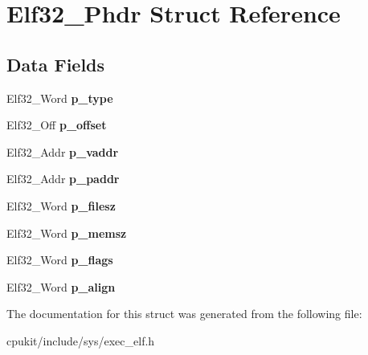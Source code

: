 \hypertarget{structElf32__Phdr}{}\section{Elf32\+\_\+\+Phdr Struct Reference}
\label{structElf32__Phdr}
\subsection*{Data Fields}
\begin{DoxyCompactItemize}
\item 
\mbox{\label{structElf32__Phdr_a8b1d2942ddb9abcb85db1429b5116923}} 
Elf32\+\_\+\+Word {\bfseries p\+\_\+type}
\item 
\mbox{\label{structElf32__Phdr_ac590d4c4b26104216e53058b5b03eef0}} 
Elf32\+\_\+\+Off {\bfseries p\+\_\+offset}
\item 
\mbox{\label{structElf32__Phdr_a01a298ebc899bcf9c23211a7bf1155a6}} 
Elf32\+\_\+\+Addr {\bfseries p\+\_\+vaddr}
\item 
\mbox{\label{structElf32__Phdr_af18f0a179a5fca09e3c04bcdce3fac2f}} 
Elf32\+\_\+\+Addr {\bfseries p\+\_\+paddr}
\item 
\mbox{\label{structElf32__Phdr_ac9151f2e11001284bf1c7d2d2659555c}} 
Elf32\+\_\+\+Word {\bfseries p\+\_\+filesz}
\item 
\mbox{\label{structElf32__Phdr_ada1cdd3d6ccb79a17bed0e3c21379c84}} 
Elf32\+\_\+\+Word {\bfseries p\+\_\+memsz}
\item 
\mbox{\label{structElf32__Phdr_a35c457e6828894b7b275730593802050}} 
Elf32\+\_\+\+Word {\bfseries p\+\_\+flags}
\item 
\mbox{\label{structElf32__Phdr_afd09d9e4297b13fc94fd57d09f2a9f70}} 
Elf32\+\_\+\+Word {\bfseries p\+\_\+align}
\end{DoxyCompactItemize}


The documentation for this struct was generated from the following file\+:\begin{DoxyCompactItemize}
\item 
cpukit/include/sys/exec\+\_\+elf.\+h\end{DoxyCompactItemize}
